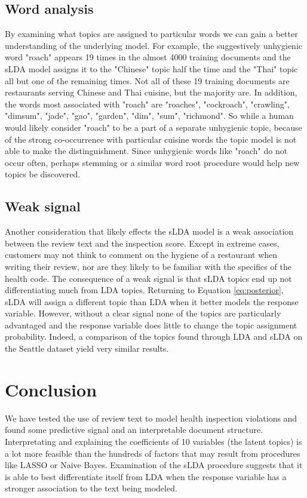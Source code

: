 \documentclass{article}
\begin{document}
\subsection{Word analysis}
By examining what topics are assigned to particular words we can gain a better understanding of the underlying model. For example, the suggestively unhygienic word "roach" appears 19 times in the almost 4000 training documents and the sLDA model assigns it to the "Chinese" topic half the time and the "Thai" topic all but one of the remaining times. Not all of these 19 training documents are restaurants serving Chinese and Thai cuisine, but the majority are. In addition, the words most associated with "roach" are "roaches", "cockroach", "crawling", "dimsum", "jade", "gao", "garden", "dim", "sum", "richmond". So while a human would likely consider "roach" to be a part of a separate unhygienic topic, because of the strong co-occurrence with particular cuisine words the topic model is not able to make the distinguishment. Since unhygienic words like "roach" do not occur often, perhaps stemming or a similar word root procedure would help new topics be discovered.

\subsection{Weak signal}
Another consideration that likely effects the sLDA model is a weak association between the review text and the inspection score. Except in extreme cases, customers may not think to comment on the hygiene of a restaurant when writing their review, nor are they likely to be familiar with the specifics of the health code. The consequence of a weak signal is that sLDA topics end up not differentiating much from LDA topics. Returning to Equation \ref{eq:posterior}, sLDA will assign a different topic than LDA when it better models the response variable. However, without a clear signal none of the topics are particularly advantaged and the response variable does little to change the topic assignment probability. Indeed, a comparison of the topics found through LDA and sLDA on the Seattle dataset yield very similar results.


\section{Conclusion}
We have tested the use of review text to model health inspection violations and found some predictive signal and an interpretable document structure. Interpretating and explaining the coefficients of 10 variables (the latent topics) is a lot more feasible than the hundreds of factors that may result from procedures like LASSO or Naive Bayes. Examination of the sLDA procedure suggests that it is able to best differentiate itself from LDA when the response variable has a stronger association to the text being modeled. 
\end{document}
